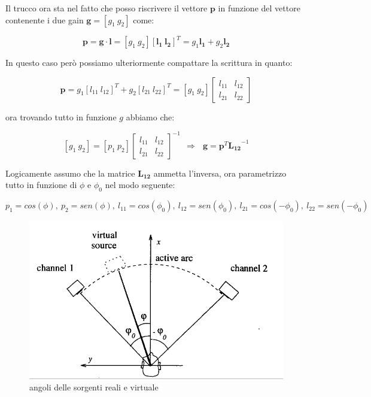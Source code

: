 \documentclass[12pt,a4paper]{report}
\begin{document}
Il trucco ora sta nel fatto che posso riscrivere il vettore $\boldsymbol{p}$ in funzione del vettore contenente i due gain $\boldsymbol{g}= \left[ g_1 \ g_2 \right]$ come:

\begin{equation}
\boldsymbol{p}= \boldsymbol{g} \cdot \boldsymbol{l} = \left[g_1 \ g_2 \right] \left[\boldsymbol{l_{1}} \ \boldsymbol{l_{2}} \right]^T = g_1 \boldsymbol{l_{1}} + g_2 \boldsymbol{l_{2}}
\label{eq:bbbb}
\end{equation}

In questo caso però possiamo ulteriormente compattare la scrittura in quanto:

\begin{equation}
\boldsymbol{p}=g_1 {\left[ l_{11} \ l_{12} \right]}^T + g_2 {\left[ l_{21} \ l_{22} \right]}^T= \left[ g_1 \ g_2 \right] \left[\begin{matrix}
l_{11} & l_{12}\\ l_{21} & l_{22}
\end{matrix} \right]
\label{eq:cccc}
\end{equation}

ora trovando tutto in funzione $g$ abbiamo che:

\begin{equation}
\left[g_1 \ g_2\right] = \left[ p_1 \ p_2 \right]  {\left[\begin{matrix} 
l_{11} & l_{12}\\ l_{21} & l_{22}
\end{matrix} \right]}^{-1} \ \ \Rightarrow \ \ \ \boldsymbol{g}=\boldsymbol{p}^T {\boldsymbol{L_{12}}}^{-1}
\label{eq:dddd}
\end{equation}

Logicamente assumo che la matrice $\boldsymbol{L_{12}}$ ammetta l'inversa, ora parametrizzo tutto in funzione di $\phi$ e $\phi_0$ nel modo seguente: 

\[ p_1=cos(\phi),\ p_2=sen(\phi),\ l_{11}=cos(\phi_0),\ l_{12}=sen(\phi_0),\ l_{21}=cos(-\phi_0),\ l_{22}=sen(-\phi_0) \]

\begin{figure}[htbp]
	\centering
	\includegraphics[scale=0.40]{figures/angoli.png}
	\caption {angoli delle sorgenti reali e virtuale} 
	\label{fig:angoli}
	\end{figure}
\end{document}
